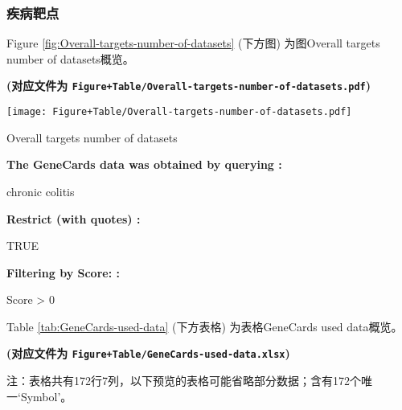 \documentclass[
]{article}
\begin{document}
\hypertarget{ux75beux75c5ux9776ux70b9}{%
\subsubsection{疾病靶点}\label{ux75beux75c5ux9776ux70b9}}

Figure \ref{fig:Overall-targets-number-of-datasets} (下方图) 为图Overall targets number of datasets概览。

\textbf{(对应文件为 \texttt{Figure+Table/Overall-targets-number-of-datasets.pdf})}

\def\@captype{figure}
\begin{center}
\texttt{[image: Figure+Table/Overall-targets-number-of-datasets.pdf]}
\caption{Overall targets number of datasets}\label{fig:Overall-targets-number-of-datasets}
\end{center}

\begin{center}\begin{tcolorbox}[colback=gray!10, colframe=gray!50, width=0.9\linewidth, arc=1mm, boxrule=0.5pt]
\textbf{
The GeneCards data was obtained by querying
:}

\vspace{0.5em}

    chronic colitis

\vspace{2em}


\textbf{
Restrict (with quotes)
:}

\vspace{0.5em}

    TRUE

\vspace{2em}


\textbf{
Filtering by Score:
:}

\vspace{0.5em}

    Score > 0

\vspace{2em}
\end{tcolorbox}
\end{center}

Table \ref{tab:GeneCards-used-data} (下方表格) 为表格GeneCards used data概览。

\textbf{(对应文件为 \texttt{Figure+Table/GeneCards-used-data.xlsx})}

\begin{center}\begin{tcolorbox}[colback=gray!10, colframe=gray!50, width=0.9\linewidth, arc=1mm, boxrule=0.5pt]注：表格共有172行7列，以下预览的表格可能省略部分数据；含有172个唯一`Symbol'。
\end{tcolorbox}
\end{center}
\end{document}
